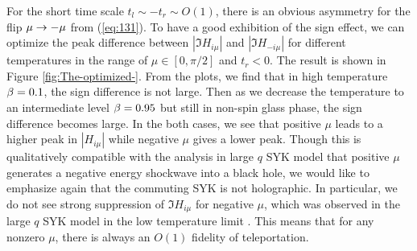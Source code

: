 \documentclass[11pt]{article}
\renewcommand{\>}{\rangle}
\newcommand{\<}{\langle}
\begin{document}
For the short time scale $t_{l}\sim-t_{r}\sim O(1)$,
there is an obvious asymmetry for the flip $\mu\rightarrow-\mu$ from (\ref{eq:131}).
To have a good exhibition of the sign effect, we can optimize the
peak difference between $|\Im H_{i\mu}|$ and $|\Im H_{-i\mu}|$ for
different temperatures in the range of $\mu\in[0,\pi/2]$ and $t_{r}<0$. The result is shown in Figure \ref{fig:The-optimized-}. From the
plots, we find that in high temperature $\beta=0.1$, the sign difference
is not large. Then as we decrease the temperature to an intermediate
level $\beta=0.95$ but still in non-spin glass phase, the sign difference becomes large. %
In the both cases, we see that positive $\mu$
leads to a higher peak in $|H_{i\mu}|$ while negative $\mu$ gives
a lower peak. Though this is qualitatively compatible with the analysis
in large $q$ SYK model \cite{Gao:2019nyj} that positive $\mu$ generates a negative
energy shockwave into a black hole, we would like to emphasize again
that the commuting SYK is not holographic. In particular, we do not
see strong suppression of $\Im H_{i\mu}$ for negative $\mu$, which was observed in the large $q$ SYK model in the low temperature limit \cite{Gao:2019nyj}. This means that for any nonzero $\mu$, there is always an $O(1)$ fidelity of teleportation. %
\end{document}
